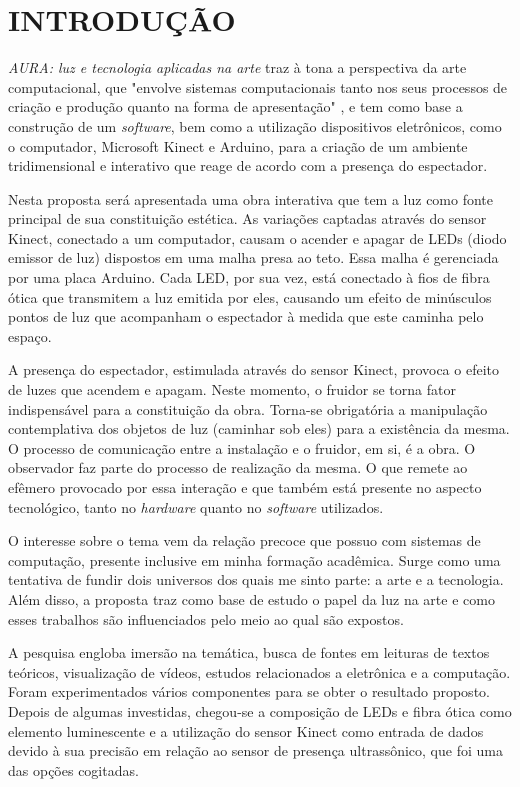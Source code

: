 %
%

\chapter{INTRODUÇÃO}\label{chap:introducao}

\textit{AURA: luz e tecnologia aplicadas na arte} traz à tona a perspectiva da arte computacional, que "envolve sistemas computacionais tanto nos seus processos de criação e produção quanto na forma de apresentação" \cite[p. 36]{boone}, e tem como base a construção de um \textit{software}, bem como a utilização dispositivos eletrônicos, como o computador, Microsoft Kinect e Arduino, para a criação de um ambiente tridimensional e interativo que reage de acordo com a presença do espectador.

Nesta proposta será apresentada uma obra interativa que tem a luz como fonte principal de sua constituição estética. As variações captadas através do sensor Kinect, conectado a um computador, causam o acender e apagar de LEDs (diodo emissor de luz) dispostos em uma malha presa ao teto. Essa malha é gerenciada por uma placa Arduino. Cada LED, por sua vez, está conectado à fios de fibra ótica que transmitem a luz emitida por eles, causando um efeito de minúsculos pontos de luz que acompanham o espectador à medida que este caminha pelo espaço.

A presença do espectador, estimulada através do sensor Kinect, provoca o efeito de luzes que acendem e apagam. Neste momento, o fruidor se torna fator indispensável para a constituição da obra. Torna-se obrigatória a manipulação contemplativa dos objetos de luz  (caminhar sob eles) para a existência da mesma. O processo de comunicação entre a instalação e o fruidor, em si, é a obra. O observador faz parte do processo de realização da mesma. O que remete ao efêmero provocado por essa interação e que também está presente no aspecto tecnológico, tanto no \textit{hardware} quanto no \textit{software} utilizados. 

O interesse sobre o tema vem da relação precoce que possuo com sistemas de computação, presente inclusive em minha formação acadêmica. Surge como uma tentativa de fundir dois universos dos quais me sinto parte: a arte e a tecnologia. Além disso, a proposta traz como base de estudo o papel da luz na arte e como esses trabalhos são influenciados pelo meio ao qual são expostos.

A pesquisa engloba imersão na temática, busca de fontes em leituras de textos teóricos, visualização de vídeos, estudos relacionados a eletrônica e a computação. Foram experimentados vários componentes para se obter o resultado proposto. Depois de algumas investidas, chegou-se a composição de LEDs e fibra ótica como elemento luminescente e a utilização do sensor Kinect como entrada de dados devido à sua precisão em relação ao sensor de presença ultrassônico, que foi uma das opções cogitadas.